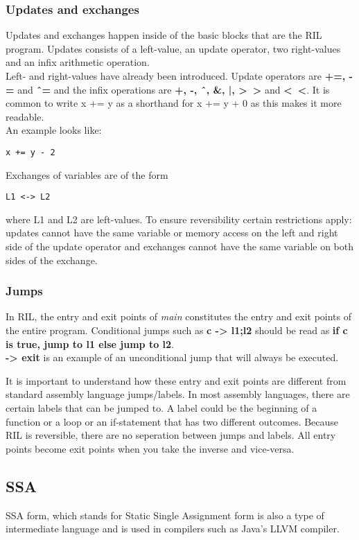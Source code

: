 \subsubsection{Updates and exchanges}
Updates and exchanges happen inside of the basic blocks that are the RIL program. Updates consists of a left-value, an update operator, two right-values and an infix arithmetic operation. \\
Left- and right-values have already been introduced. Update operators are \textbf{+=, -=} and \textbf{\^\  =} and the infix operations are \textbf{+, -, \^\ , \&, |, >\ >} and \textbf{<\ <}. It is common to write x += y as a shorthand for x += y + 0 as this makes it more readable. \\
An example looks like:
\begin{verbatim}
x += y - 2
\end{verbatim}
Exchanges of variables are of the form
\begin{verbatim}
L1 <-> L2
\end{verbatim}
where L1 and L2 are left-values.
To ensure reversibility certain restrictions apply:
updates cannot have the same variable or memory access on the left and right side of the update operator and exchanges cannot have the same variable on both sides of the exchange.

\subsubsection{Jumps}
In RIL, the entry and exit points of \emph{main} constitutes the entry and exit points of the entire program. Conditional jumps such as \textbf{c -> l1;l2} should be read as \textbf{if c is true, jump to l1 else jump to l2}. \\
\textbf{-> exit} is an example of an unconditional jump that will always be executed.

It is important to understand how these entry and exit points are different from standard assembly language jumps/labels. In most assembly languages, there are certain labels that can be jumped to. A label could be the beginning of a function or a loop or an if-statement that has two different outcomes.
Because RIL is reversible, there are no seperation between jumps and labels. All entry points become exit points when you take the inverse and vice-versa.


\subsection{SSA}
SSA form, which stands for Static Single Assignment form is also a type of intermediate language and is used in compilers such as Java's LLVM compiler.

